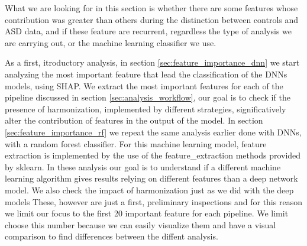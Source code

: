\documentclass[11pt]{report}
\begin{document}
What we are looking for in this section is whether there are some features whose contribution was greater than others during the distinction between controls and ASD data, and if these feature are recurrent, regardless the type of analysis we are carrying out, or the machine learning classifier we use.

As a first, itroductory analysis, in section \ref{sec:feature_importance_dnn} we start analyzing the most important feature that lead the classification of the DNNs models, using SHAP.
We extract the most important features for each of the pipeline discussed in section \ref{sec:analysis_workflow}, our goal is to check if the presence of harmonization, implemented by different strategies, significatively alter the contribution of features in the output of the model.
In section \ref{sec:feature_importance_rf} we repeat the same analysis earlier done with DNNs, with a random forest classifier. For this machine learning model, feature extraction is implemented by the use of the feature\_extraction methods provided by sklearn.
In these analysis our goal is to understand if a different machine learning algorithm gives results relying on different features than a deep network model.
We also check the impact of harmonization just as we did with the deep models
These, however are just a first, preliminary inspections and for this reason we limit our focus to the first 20 important feature for each pipeline.
We limit choose this number because we can easily visualize them and have a visual comparison to find differences between the diffent analysis.
\end{document}
